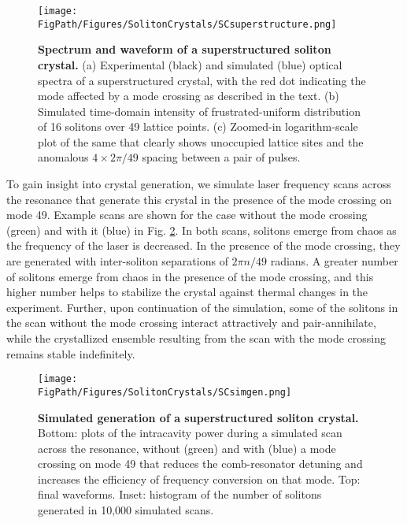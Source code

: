 \begin{figure}[htpb]
	\begin{center}
		\texttt{[image: \\FigPath/Figures/SolitonCrystals/SCsuperstructure.png]}
	\end{center}
	\caption[Spectrum and waveform of a superstructed soliton crystal]{\textbf{Spectrum and waveform of a superstructured soliton crystal.} (a) Experimental (black) and simulated (blue) optical spectra of a superstructured crystal, with the red dot indicating the mode affected by a mode crossing as described in the text. (b) Simulated time-domain intensity of frustrated-uniform distribution of 16 solitons over 49 lattice points. (c) Zoomed-in logarithm-scale plot of the same that clearly shows unoccupied lattice sites and the anomalous $4\times2\pi/49$ spacing between a pair of pulses.}
	\label{fig:SCsuperstructure}
\end{figure} 

To gain insight into crystal generation, we simulate laser frequency scans across the resonance that generate this crystal in the presence of the mode crossing on mode 49. Example scans are shown for the case without the mode crossing (green) and with it (blue) in Fig. \ref{fig:SCsimgen}. In both scans, solitons emerge from chaos as the frequency of the laser is decreased. In the presence of the mode crossing, they are generated with inter-soliton separations of $2\pi n/49$ radians. A greater number of solitons emerge from chaos in the presence of the mode crossing, and this higher number helps to stabilize the crystal against thermal changes in the experiment. Further, upon continuation of the simulation, some of the solitons in the scan without the mode crossing interact attractively and pair-annihilate, while the crystallized ensemble resulting from the scan with the mode crossing remains stable indefinitely.

\begin{figure}[htpb]
	\begin{center}
		\texttt{[image: \\FigPath/Figures/SolitonCrystals/SCsimgen.png]}
	\end{center}
	\caption[Simulated generation of a superstructured soliton crystal]{\textbf{Simulated generation of a superstructured soliton crystal.} Bottom: plots of the intracavity power during a simulated scan across the resonance, without (green) and with (blue) a mode crossing on mode 49 that reduces the comb-resonator detuning and increases the efficiency of frequency conversion on that mode. Top: final waveforms. Inset: histogram of the number of solitons generated in 10,000 simulated scans.}
	\label{fig:SCsimgen}
\end{figure} 

